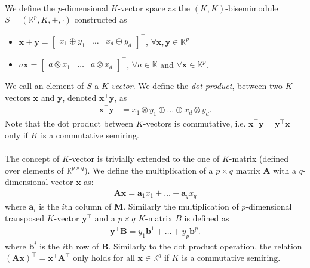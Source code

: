 \paragraph{} We define the $p$-dimensional $K$-vector space as the $(K, K)$-bisemimodule $S = (\mathbb{K}^p, K, +, \cdot)$ constructed as 
\begin{itemize}
    \item $\mathbf{x} + \mathbf{y} = \begin{bmatrix} x_1 \oplus y_1 & \dots & x_d \oplus y_d \end{bmatrix}^\top$, $\forall \mathbf{x}, \mathbf{y} \in \mathbb{K}^p$ 
    \item $a \mathbf{x} = \begin{bmatrix} a \otimes x_1 & \dots & a \otimes x_d \end{bmatrix}^\top$, $\forall a \in \mathbb{K}$ and $\forall \mathbf{x} \in \mathbb{K}^p$.
\end{itemize}
We call an element of $S$ a $K$-\emph{vector}. We define the \emph{dot product}, between two $K$-vectors $\mathbf{x}$ and $\mathbf{y}$, denoted $\mathbf{x}^\top \mathbf{y}$, as 
\begin{align}
    \mathbf{x}^\top \mathbf{y} &= x_1 \otimes y_1 \oplus \dots \oplus x_d \otimes y_d.
\end{align}
Note that the dot product between $K$-vectors is commutative, i.e. $\mathbf{x}^\top \mathbf{y} = \mathbf{y}^\top \mathbf{x}$ only if $K$ is a commutative semiring. 

\paragraph{} The concept of $K$-vector is trivially extended to the one of $K$-matrix (defined over elements of $\mathbb{K}^{p \times q}$). We define the multiplication of a $p \times q$ matrix $\mathbf{A}$ with a $q$-dimensional vector $\mathbf{x}$ as: 
\begin{align}
    \mathbf{A} \mathbf{x} = \mathbf{a}_1 x_1 + \dots + \mathbf{a}_q x_q 
    \label{eq:mv_mul}
\end{align}
where $\mathbf{a}_i$ is the $i$th column of $\mathbf{M}$. Similarly the multiplication of $p$-dimensional transposed $K$-vector $\mathbf{y}^\top$ and a $p \times q$ $K$-matrix $B$ is defined as 
\begin{align}
    \mathbf{y}^\top \mathbf{B} = y_1 \mathbf{b}^1 + \dots + y_p \mathbf{b}^p.
    \label{eq:mvt_mul}
\end{align}
where $\mathbf{b}^i$ is the $i$th row of $\mathbf{B}$. Similarly to the dot product operation, the relation $(\mathbf{A} \mathbf{x})^\top = \mathbf{x}^\top \mathbf{A}^\top$ only holds for all $\mathbf{x} \in \mathbb{K}^q$ if $K$ is a commutative semiring.

